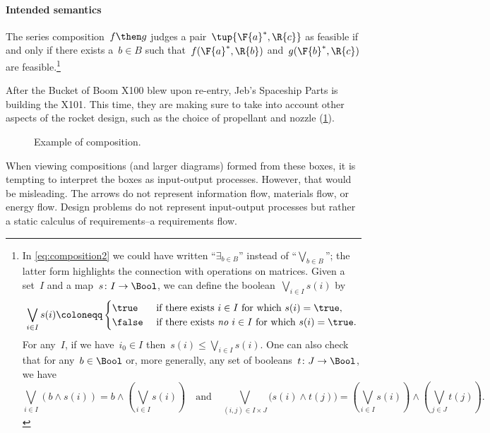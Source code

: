 \paragraph{Intended semantics}
The series composition~$f\then g$ judges a pair~$\tup{\F{a}^*,\R{c}}$ as feasible if and only if there exists a~$b \in B$ such that~$f(\F{a}^*,\R{b})$ and~$g(\F{b}^*,\R{c})$ are feasible.\footnote{In \eqref{eq:composition2} we could have written ``$\exists_{b\in B}$''
instead of ``$\bigvee_{b\in B}$''; the latter form highlights the connection
with operations on matrices. Given a set~$I$ and a map~$s\colon I\to\Bool$, we can define the boolean~$\bigvee_{i\in I}s(i)$ by
\begin{equation*}
 \bigvee_{i\in I}s(i)\coloneqq
 \begin{cases}
 	\true&\text{ if there exists }i\in I\text{ for which }s(i)=\true,\\
 	\false&\text{ if there exists \emph{no} }i\in I\text{ for which }s(i)=\true.
 \end{cases}
 \end{equation*}
 For any~$I$, if we have~$i_0\in I$ then~$s(i)\leq\bigvee_{i\in I}s(i)$. One can also check that for any~$b\in\Bool$ or, more generally, any set of booleans~$t\colon J\to\Bool$, we have
 \begin{equation*}
     \bigvee_{i\in I}(b\wedge s(i))=b\wedge\left(\bigvee_{i\in I}s(i)\right)
 \quad\text{and}\quad
 \bigvee_{(i,j)\in I\times  J}\big(s(i)\wedge t(j)\big)=\left(\bigvee_{i\in I}s(i)\right)\wedge\left(\bigvee_{j\in J} t(j)\right).
 \end{equation*}
}

\begin{example}
After the Bucket of Boom X100 blew upon re-entry, Jeb's Spaceship Parts is building the X101. This time, they are making sure to take into account other aspects of the rocket design, such as the choice of propellant and nozzle (\cref{fig:examplecomposition}).
\begin{figure}[h!]
\begin{center}
\end{center}
\caption{Example of composition. \label{fig:examplecomposition}}
\end{figure}
\end{example}

\begin{remark}
When viewing compositions (and larger diagrams) formed from these boxes, it is tempting to interpret the boxes as input-output processes. However, that would be misleading. The arrows do not represent information flow, materials flow, or energy flow. Design problems do not represent input-output processes but rather a static calculus of requirements--a requirements flow.
\end{remark}


